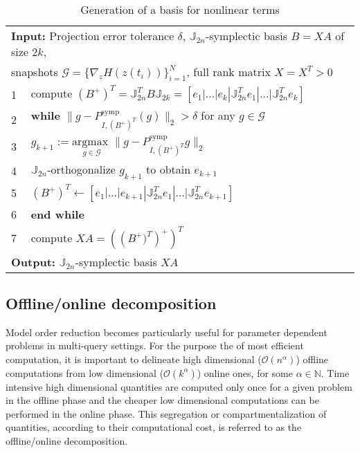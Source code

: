 {\begin{table} 
\captionsetup{name=Algorithm,type=table}
\caption{Generation of a basis for nonlinear terms} \begin{tabular}{l l}
\multicolumn{2}{l}{{\bf Input:} Projection error tolerance $\delta$, $\mathbb J_{2n}$-symplectic basis $B = X A$ of size $2k$,}\\
\multicolumn{2}{l}{snapshots $\mathcal G = \{ \nabla_zH(z(t_i))\}_{i=1}^{N}$, full rank matrix $X=X^T>0$}
\\1 & compute $(B^+)^T = \mathbb J_{2n}^T B \mathbb J_{2k} = [e_1|\dots |e_{k} | \mathbb J_{2n}^Te_1|\dots| \mathbb J_{2n}^Te_{k}]$
\\2 & \textbf{while} $\| g - P_{I,(B^+)^T}^{\text{symp}} (g) \|_2 > \delta$ for any $g \in \mathcal G$
\\3 & \hspace{0.5cm} $g_{k+1} := \underset{g\in \mathcal G}{\text{argmax }} \| g -  P_{I,(B^+)^T}^{\text{symp}} g  \|_2$
\\4 & \hspace{0.5cm} $\mathbb J_{2n}$-orthogonalize $g_{k+1}$ to obtain $e_{k+1}$
\\5 & \hspace{0.5cm} $(B^+)^T \leftarrow [e_1|\dots |e_{k+1} | \mathbb J_{2n}^Te_1|\dots| \mathbb J_{2n}^Te_{k+1}]$
\\6 & \textbf{end while}
\\7 & compute $XA = \left( \left (B^+)^T \right)^+ \right)^T$
\\ \multicolumn{2}{l}{{\bf Output:} $\mathbb J_{2n}$-symplectic basis $XA$}
\end{tabular}
\label{alg:3}
\end{table}
}

\subsection{Offline/online decomposition} \label{sec:normmor.4}
Model order reduction becomes particularly useful for parameter dependent problems in multi-query settings. For the purpose the of most efficient computation, it is important to delineate high dimensional ($\mathcal{O}(n^{\alpha})$) offline computations from low dimensional ($\mathcal{O}(k^{\alpha})$) online ones, for some $\alpha \in \mathbb N$. Time intensive high dimensional quantities are computed only once for a given problem in the offline phase and the cheaper low dimensional computations can be performed in the online phase. This segregation or compartmentalization of quantities, according to their computational cost, is referred to as the offline/online decomposition.

